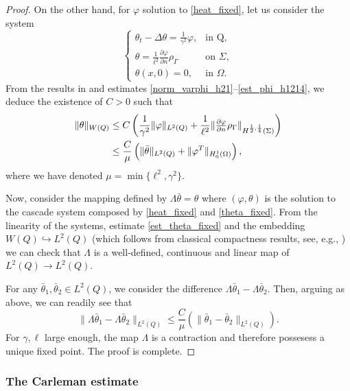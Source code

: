 \documentclass[preprint,10pt]{article}
\numberwithin{equation}{section}
\numberwithin{theorem}{section}
\def\csbd{\rho_{\Gamma}}
\begin{document}
{\begin{proof}
On the other hand, for $\varphi$ solution to \eqref{heat_fixed}, let us consider the system
%
\begin{equation}\label{theta_fixed}
\begin{cases}
\theta_t-\Delta \theta=\frac{1}{\gamma^2}\varphi, & \text{in Q}, \\
\theta=\frac{1}{\ell^2}\frac{\partial \varphi}{\partial n}\csbd &\text{on } \Sigma, \\
\theta(x,0)=0, & \text{in } \Omega.
\end{cases}
\end{equation}
%
From the results in \cite[Ch. 4, \S15.5]{lions_magenes} and estimates \eqref{norm_varphi_h21}--\eqref{est_phi_h1214}, we deduce the existence of $C>0$ such that
%
\begin{align}\notag
\|\theta\|_{W(Q)}&\leq C\left(\frac{1}{\gamma^2}\|\varphi\|_{L^2(Q)}+\frac{1}{\ell^2}\|\tfrac{\partial \varphi}{\partial n}\csbd \|_{H^{\frac12,\frac14}(\Sigma)}\right) \\ \label{est_theta_fixed}
&\leq \frac{C}{\mu}\left(\|\bar\theta\|_{L^2(Q)}+\|\varphi^T\|_{H^{1}_0(\Omega)}\right),
\end{align}
%
where we have denoted $\mu=\min\{\ell^2,\gamma^2\}$.

Now, consider the mapping defined by $\Lambda\bar\theta=\theta$ where $(\varphi,\theta)$ is the solution to the cascade system composed by \eqref{heat_fixed} and \eqref{theta_fixed}. From the linearity of the systems, estimate \eqref{est_theta_fixed} and the embedding $W(Q)\hookrightarrow L^2(Q)$ (which follows from classical compactness results, see, e.g., \cite{simon}) we can check that $\Lambda$ is a well-defined, continuous and linear map of $L^2(Q)\to L^2(Q)$.

For any $\bar\theta_1,\bar\theta_2\in L^2(Q)$, we consider the difference $\Lambda\bar\theta_1-\Lambda\bar\theta_2$. Then, arguing as above, we can readily see that
%
\begin{equation*}
\|\Lambda \bar\theta_1-\Lambda \bar\theta_2\|_{L^2(Q)}\leq \frac{C}{\mu}\left(\|\bar\theta_1-\bar\theta_2\|_{L^2(Q)}\right).
\end{equation*}
%
For $\gamma,\ell$ large enough, the map $\Lambda$ is a contraction and therefore possesess a unique fixed point. The proof is complete. 
\end{proof}

\subsubsection*{The Carleman estimate}

}
\end{document}
